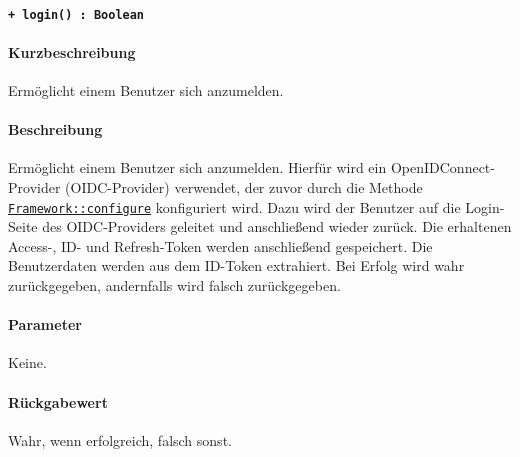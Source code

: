 \paragraph{\texttt{+ login() : Boolean}}\label{AP_Framework_login}%
\paragraph*{Kurzbeschreibung}
Ermöglicht einem Benutzer sich anzumelden.
\paragraph*{Beschreibung}
Ermöglicht einem Benutzer sich anzumelden.
Hierfür wird ein OpenIDConnect-Provider (OIDC-Provider) verwendet, der zuvor durch die Methode \hyperref[AP_Framework_configure]{\texttt{Framework::configure}} konfiguriert wird.
Dazu wird der Benutzer auf die Login-Seite des OIDC-Providers geleitet und anschließend wieder zurück.
Die erhaltenen Access-, ID- und Refresh-Token werden anschließend gespeichert.
Die Benutzerdaten werden aus dem ID-Token extrahiert.
Bei Erfolg wird wahr zurückgegeben, andernfalls wird falsch zurückgegeben.
\paragraph*{Parameter}
Keine.
\paragraph*{Rückgabewert}
Wahr, wenn erfolgreich, falsch sonst.
